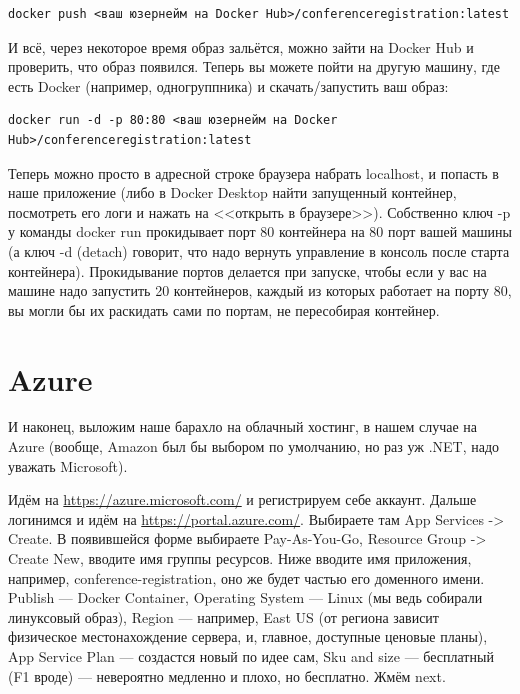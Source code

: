 \documentclass[a5paper]{article}
\begin{document}
\begin{verbatim}
docker push <ваш юзернейм на Docker Hub>/conferenceregistration:latest
\end{verbatim}

И всё, через некоторое время образ зальётся, можно зайти на Docker Hub и проверить, что образ появился. Теперь вы можете пойти на другую машину, где есть Docker (например, одногруппника) и скачать/запустить ваш образ:

\begin{verbatim}
docker run -d -p 80:80 <ваш юзернейм на Docker Hub>/conferenceregistration:latest
\end{verbatim}

Теперь можно просто в адресной строке браузера набрать localhost, и попасть в наше приложение (либо в Docker Desktop найти запущенный контейнер, посмотреть его логи и нажать на <<открыть в браузере>>). Собственно ключ -p у команды docker run прокидывает порт 80 контейнера на 80 порт вашей машины (а ключ -d (detach) говорит, что надо вернуть управление в консоль после старта контейнера). Прокидывание портов делается при запуске, чтобы если у вас на машине надо запустить 20 контейнеров, каждый из которых работает на порту 80, вы могли бы их раскидать сами по портам, не пересобирая контейнер.

\section{Azure}

И наконец, выложим наше барахло на облачный хостинг, в нашем случае на Azure (вообще, Amazon был бы выбором по умолчанию, но раз уж .NET, надо уважать Microsoft). 

Идём на \url{https://azure.microsoft.com/} и регистрируем себе аккаунт. Дальше логинимся и идём на \url{https://portal.azure.com/}. Выбираете там App Services -> Create. В появившейся форме выбираете Pay-As-You-Go, Resource Group -> Create New, вводите имя группы ресурсов. Ниже вводите имя приложения, например, conference-registration, оно же будет частью его доменного имени. Publish --- Docker Container, Operating System --- Linux (мы ведь собирали линуксовый образ), Region --- например, East US (от региона зависит физическое местонахождение сервера, и, главное, доступные ценовые планы), App Service Plan --- создастся новый по идее сам, Sku and size --- бесплатный (F1 вроде) --- невероятно медленно и плохо, но бесплатно. Жмём next.
\end{document}
